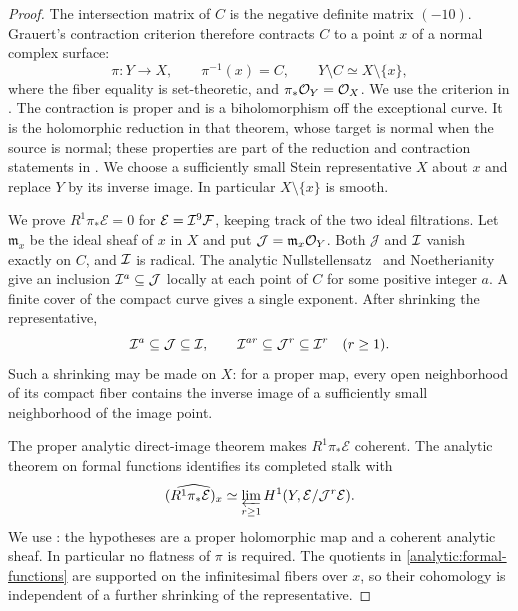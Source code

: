 \begin{proof}
The intersection matrix of $C$ is the negative definite matrix
$(-10)$.  Grauert's contraction criterion therefore contracts $C$
to a point $x$ of a normal complex surface:
\[
 \pi:Y\longrightarrow X,\qquad \pi^{-1}(x)=C,
 \qquad Y\setminus C\simeq X\setminus\{x\},
\]
where the fiber equality is set-theoretic, and
$\pi_*\mathcal O_Y=\mathcal O_X$.
We use the criterion in \cite[\S4.8(e), pp.~366--367]{Grauert1962}.
The contraction is proper and is a biholomorphism off the
exceptional curve.  It is the holomorphic reduction in that theorem,
whose target is normal when the source is normal; these properties
are part of the reduction and contraction
statements in \cite[\S2, p.~337 and Definition~3,
pp.~339--340]{Grauert1962}.  We choose a sufficiently small Stein
representative $X$ about $x$ and replace $Y$ by its inverse image.
In particular $X\setminus\{x\}$ is smooth.

We prove $R^1\pi_*\mathcal E=0$ for
$\mathcal E=\mathcal I^9\mathcal F$, keeping track of the two ideal filtrations.
Let $\mathfrak m_x$ be the ideal sheaf of $x$ in $X$ and put
$\mathcal J=\mathfrak m_x\mathcal O_Y$.  Both $\mathcal J$ and $\mathcal I$
vanish exactly on $C$, and $\mathcal I$ is radical.  The analytic
Nullstellensatz~\cite[Chapter~II, Theorem~4.22]{Demailly2012}
and Noetherianity give an inclusion
$\mathcal I^a\subseteq\mathcal J$ locally at each point of $C$ for some
positive integer $a$.  A finite cover of the compact curve gives a
single exponent.  After shrinking the representative,
\begin{equation}\label{analytic:cofinal}
 \mathcal I^a\subseteq\mathcal J\subseteq\mathcal I,
 \qquad
 \mathcal I^{ar}\subseteq\mathcal J^r\subseteq\mathcal I^r
 \quad(r\geq1).
\end{equation}
Such a shrinking may be made on $X$: for a proper map, every open
neighborhood of its compact fiber contains the inverse image of a
sufficiently small neighborhood of the image point.

The proper analytic direct-image theorem makes
$R^1\pi_*\mathcal E$ coherent.  The analytic theorem on formal
functions identifies its completed stalk with
\begin{equation}\label{analytic:formal-functions}
 \widehat{(R^1\pi_*\mathcal E)_x}
 \simeq
 \varprojlim_{r\geq1}H^1(Y,\mathcal E/\mathcal J^r\mathcal E).
\end{equation}
We use \cite[\S6, Haupts\"atze~I and~IIa,
p.~59]{Grauert1960}: the hypotheses are a proper holomorphic map
and a coherent analytic sheaf.  In particular no flatness of
$\pi$ is required.  The quotients in
\eqref{analytic:formal-functions} are supported on the infinitesimal
fibers over $x$, so their cohomology is independent of a further
shrinking of the representative.


\end{proof}
